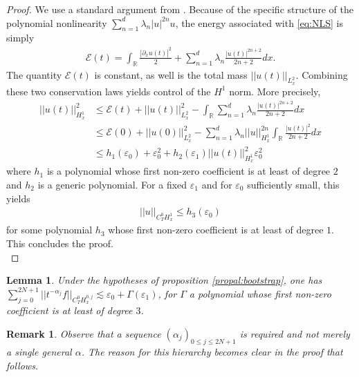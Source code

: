 \documentclass[a4paper, 15pt]{article}
\numberwithin{equation}{section}
\newtheorem{rem}[defi]{Remark}
\newtheorem{lem}[defi]{Lemma}
\begin{document}
\begin{proof}
We use a standard argument from \cite{zbMATH02001571}. Because of the specific structure of the polynomial nonlinearity $\sum_{n=1}^{d}\lambda_n|u|^{2n}u$, the energy associated with \eqref{eq:NLS} is simply
\begin{align}
\mathcal{E}(t)=\int_\mathbb{R}\frac{|\partial_xu(t)|^2}{2}+\sum_{n=1}^{d}\lambda_n\frac{|u(t)|^{2n+2}}{2n+2}dx.
\end{align}
The quantity $\mathcal{E}(t)$ is constant, as well is the total mass $||u(t)||_{L^2_x}$. Combining these two conservation laws yields control of the $H^1$ norm. More precisely, 
\begin{align*}
||u(t)||^2_{H^1_x}&\leq \mathcal{E}(t)+||u(t)||^2_{L^2_x}-\int_\mathbb{R}\sum_{n=1}^{d}\lambda_n\frac{|u(t)|^{2n+2}}{2n+2}dx\\
&\leq \mathcal{E}(0)+||u(0)||^2_{L^2_x}-\sum_{n=1}^{d}\lambda_n||u||_{H^1_x}^{2n}\int_\mathbb{R}\frac{|u(t)|^{2}}{2n+2}dx\\
&\leq h_1(\varepsilon_0)+\varepsilon_0^2+h_2(\varepsilon_1)||u(t)||_{H^1_x}^{2}\varepsilon_0^2
\end{align*}
where $h_1$ is a polynomial whose first non-zero coefficient is at least of degree $2$ and $h_2$ is a generic polynomial. For a fixed $\varepsilon_1$ and for $\varepsilon_0$ sufficiently small, this yields 
\begin{align*}
||u||_{C^0_TH^1_x}\leq h_3(\varepsilon_0)
\end{align*}
for some polynomial $h_3$ whose first non-zero coefficient is at least of degree $1$. This concludes the proof.\\
\end{proof}
\begin{lem}
\label{lem:bootstrapflem}
Under the hypotheses of proposition \ref{propal:bootstrap}, one has
$\sum^{2N+1}_{j=0}||t^{-\alpha_j}f||_{C^0_TH^{0,j}_x}\lesssim \varepsilon_0 +\Gamma(\varepsilon_1)$,
for $\Gamma$ a polynomial whose first non-zero coefficient is at least of degree $3$. \\
\end{lem}
\begin{rem}
Observe that a sequence $(\alpha_j)_{0\leq j\leq 2N+1}$ is required and not merely a single general $\alpha$. The reason for this hierarchy becomes clear in the proof that follows.
\end{rem}
\end{document}
